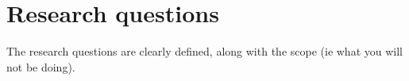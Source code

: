 \chapter{Research questions}
The research questions are clearly defined, along with the scope (ie what you will not be doing).